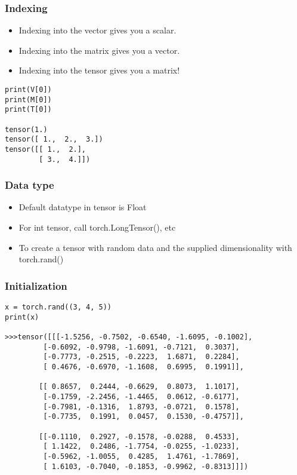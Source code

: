  
\begin{frame}[fragile]
\frametitle{Indexing}
\begin{itemize}
\item Indexing into the vector gives you a scalar. 
\item Indexing into the matrix gives you a vector. 
\item Indexing into the tensor gives you a matrix!
\end{itemize}

 \begin{lstlisting}
print(V[0])
print(M[0])
print(T[0])

tensor(1.)
tensor([ 1.,  2.,  3.])
tensor([[ 1.,  2.],
        [ 3.,  4.]])
 \end{lstlisting}

 \end{frame} 
 
 
\begin{frame}[fragile]
\frametitle{Data type}
\begin{itemize}
\item Default datatype in tensor is Float
\item For int tensor, call torch.LongTensor(), etc
\item To create a tensor with random data and the supplied dimensionality with torch.rand()
\end{itemize}

 \end{frame} 
 
\begin{frame}[fragile]
\frametitle{Initialization}
 \begin{lstlisting}
x = torch.rand((3, 4, 5))
print(x)

>>>tensor([[[-1.5256, -0.7502, -0.6540, -1.6095, -0.1002],
         [-0.6092, -0.9798, -1.6091, -0.7121,  0.3037],
         [-0.7773, -0.2515, -0.2223,  1.6871,  0.2284],
         [ 0.4676, -0.6970, -1.1608,  0.6995,  0.1991]],

        [[ 0.8657,  0.2444, -0.6629,  0.8073,  1.1017],
         [-0.1759, -2.2456, -1.4465,  0.0612, -0.6177],
         [-0.7981, -0.1316,  1.8793, -0.0721,  0.1578],
         [-0.7735,  0.1991,  0.0457,  0.1530, -0.4757]],

        [[-0.1110,  0.2927, -0.1578, -0.0288,  0.4533],
         [ 1.1422,  0.2486, -1.7754, -0.0255, -1.0233],
         [-0.5962, -1.0055,  0.4285,  1.4761, -1.7869],
         [ 1.6103, -0.7040, -0.1853, -0.9962, -0.8313]]])
 \end{lstlisting}

 \end{frame} 
 
